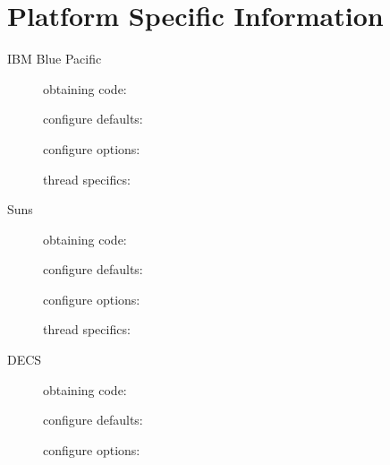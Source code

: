 \section{Platform Specific Information}
\begin{description}

\item[IBM Blue Pacific]
obtaining code:
\newline
\newline

configure defaults:
\newline
\newline

configure options:
\newline
\newline

thread specifics:
\newline
\newline

\item[Suns]
obtaining code:
\newline
\newline

configure defaults:
\newline
\newline

configure options:
\newline
\newline

thread specifics:
\newline
\newline

\item[DECS]
obtaining code:
\newline
\newline

configure defaults:
\newline
\newline

configure options:
\newline
\newline

\end{description}


